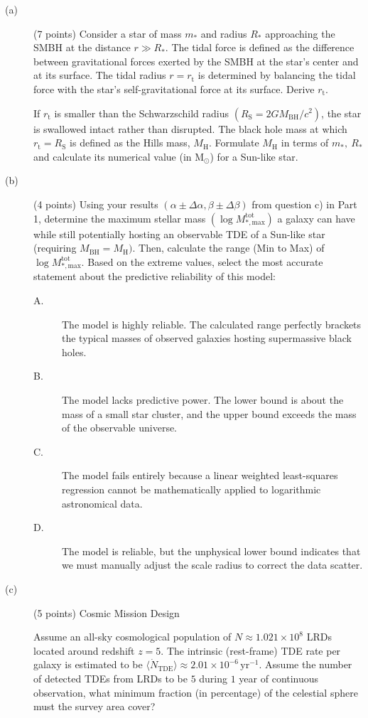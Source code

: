 \begin{description}
\item[(a)] (7 points) Consider a star of mass $m_*$ and radius $R_*$
  approaching the SMBH at the distance $r \gg R_*$. The tidal force is defined
  as the difference between gravitational forces exerted by the SMBH at the
  star's center and at its surface. The tidal radius $r = r_{\mathrm{t}}$ is
  determined by balancing the tidal force with the star's self-gravitational
  force at its surface. Derive $r_{\mathrm{t}}$.

  If $r_{\mathrm{t}}$ is smaller than the Schwarzschild radius
  $(R_{\mathrm{S}} = 2GM_{\mathrm{BH}}/c^2)$, the star is swallowed intact
  rather than disrupted. The black hole mass at which
  $r_{\mathrm{t}} = R_{\mathrm{S}}$ is defined as the Hills mass,
  $M_{\mathrm{H}}$. Formulate $M_{\mathrm{H}}$ in terms of $m_*,\ R_*$ and
  calculate its numerical value (in $\mathrm{M}_\odot$) for a Sun-like star.
\item[(b)] (4 points) Using your results
  $(\alpha \pm \Delta\alpha, \beta \pm \Delta\beta)$ from question c) in
  Part 1, determine the maximum stellar mass
  $(\log M_{*,\mathrm{max}}^{\mathrm{tot}})$ a galaxy can have while still
  potentially hosting an observable TDE of a Sun-like star (requiring
  $M_{\mathrm{BH}} = M_{\mathrm{H}})$. Then, calculate the range (Min to Max)
  of $\log M_{*,\mathrm{max}}^{\mathrm{tot}}$. Based on the extreme values,
  select the most accurate statement about the predictive reliability of this
  model:
  \begin{description}
  \item[A.] The model is highly reliable. The calculated range perfectly
    brackets the typical masses of observed galaxies hosting supermassive
    black holes.
  \item[B.] The model lacks predictive power. The lower bound is about the
    mass of a small star cluster, and the upper bound exceeds the mass of the
    observable universe.
  \item[C.] The model fails entirely because a linear weighted least-squares
    regression cannot be mathematically applied to logarithmic astronomical
    data.
  \item[D.] The model is reliable, but the unphysical lower bound indicates
    that we must manually adjust the scale radius to correct the data scatter.
  \end{description}
\item[(c)] (5 points) Cosmic Mission Design

  Assume an all-sky cosmological population of $N \approx 1.021 \times 10^8$
  LRDs located around redshift $z = 5$. The intrinsic (rest-frame) TDE rate per
  galaxy is estimated to be
  $\langle \dot{N}_{\mathrm{TDE}} \rangle \approx 2.01 \times 10^{-6}\,\mathrm{yr^{-1}}$.
  Assume the number of detected TDEs from LRDs to be $5$ during $1$ year of
  continuous observation, what minimum fraction (in percentage) of the
  celestial sphere must the survey area cover?
\end{description}

